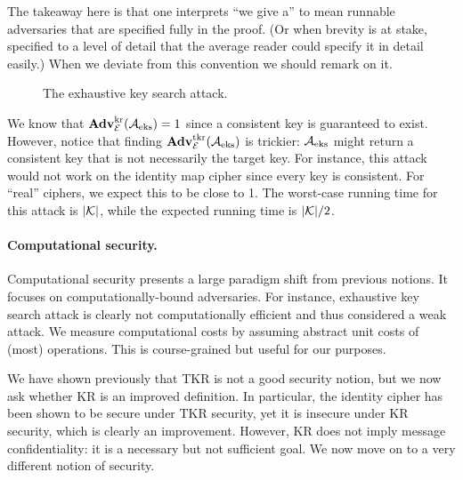 The takeaway here is that one interprets ``we give a'' to mean runnable
adversaries that are specified fully in the proof. (Or when brevity is at stake,
specified to a level of detail that the average reader could specify it in
detail easily.)  When we deviate from this convention we should remark on it.

\begin{wrapfigure}{r}{0pt}
	\caption{The exhaustive key search attack.}
	\label{fig:eks}
\end{wrapfigure}  

We know that $\mathbf{Adv}^{\mathrm{kr}}_{{\cal E}}({\mathcal A}_{\textnormal{eks}}) = 1$ since a consistent key is guaranteed to exist. However, notice that finding $\mathbf{Adv}^{\mathrm{tkr}}_{{\cal E}}({\mathcal A}_{\textnormal{eks}})$ is trickier: ${\mathcal A}_{\textnormal{eks}}$ might return a consistent key that is not necessarily the target key. For instance, this attack would not work on the identity map cipher since every key is consistent. For ``real'' ciphers, we expect this to be close to 1. 
The worst-case running time for this attack is $|{\cal K}|$, while the expected running time is $|{\cal K}|/2$.

\paragraph{Computational security.} Computational security presents a large paradigm shift from previous notions. It focuses on computationally-bound adversaries. For instance, exhaustive key search attack is clearly not computationally efficient and thus considered a weak attack. We measure computational costs by assuming abstract unit costs of (most) operations. This is course-grained but useful for our purposes. 

We have shown previously that TKR is not a good security notion, but we now ask whether KR is an improved definition. In particular, the identity cipher has been shown to be secure under TKR security, yet it is insecure under KR security, which is clearly an improvement. However, KR does not imply message confidentiality: it is a necessary but not sufficient goal. We now move on to a very different notion of security.

